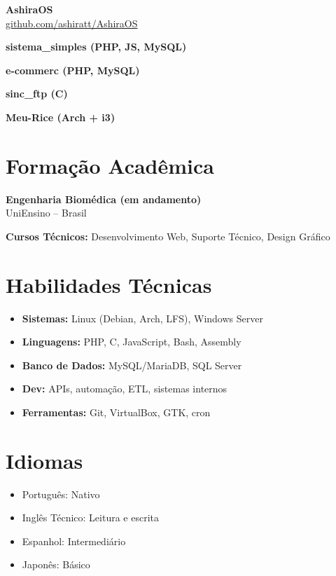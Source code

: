 \documentclass[11pt,a4paper]{article}
\begin{document}
\textbf{AshiraOS}\\
\href{https://github.com/ashiratt/AshiraOS}{github.com/ashiratt/AshiraOS}

\textbf{sistema\_simples (PHP, JS, MySQL)}

\textbf{e-commerc (PHP, MySQL)}

\textbf{sinc\_ftp (C)}

\textbf{Meu-Rice (Arch + i3)}

\section{Formação Acadêmica}

\textbf{Engenharia Biomédica (em andamento)}\\
UniEnsino -- Brasil

\textbf{Cursos Técnicos:}
Desenvolvimento Web, Suporte Técnico, Design Gráfico

\section{Habilidades Técnicas}

\begin{itemize}
    \item \textbf{Sistemas:} Linux (Debian, Arch, LFS), Windows Server
    \item \textbf{Linguagens:} PHP, C, JavaScript, Bash, Assembly
    \item \textbf{Banco de Dados:} MySQL/MariaDB, SQL Server
    \item \textbf{Dev:} APIs, automação, ETL, sistemas internos
    \item \textbf{Ferramentas:} Git, VirtualBox, GTK, cron
\end{itemize}

\section{Idiomas}

\begin{itemize}
    \item Português: Nativo
    \item Inglês Técnico: Leitura e escrita
    \item Espanhol: Intermediário
    \item Japonês: Básico
\end{itemize}
\end{document}
